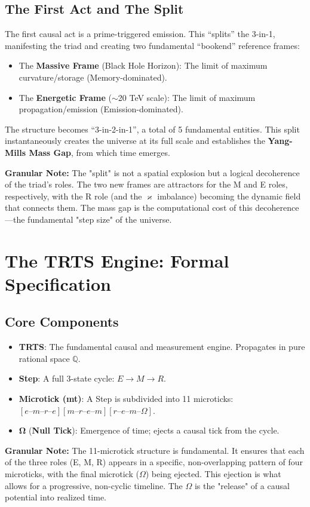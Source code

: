 \documentclass[12pt]{article}
\begin{document}
\subsection{The First Act and The Split}
The first causal act is a prime-triggered emission. This ``splits'' the 3-in-1, manifesting the triad and creating two fundamental ``bookend'' reference frames:
\begin{itemize}
    \item The \textbf{Massive Frame} (Black Hole Horizon): The limit of maximum curvature/storage (Memory-dominated).
    \item The \textbf{Energetic Frame} ($\sim$20 TeV scale): The limit of maximum propagation/emission (Emission-dominated).
\end{itemize}
The structure becomes ``3-in-2-in-1'', a total of 5 fundamental entities. This split instantaneously creates the universe at its full scale and establishes the \textbf{Yang-Mills Mass Gap}, from which time emerges.

\textbf{Granular Note:} The "split" is not a spatial explosion but a logical decoherence of the triad's roles. The two new frames are attractors for the M and E roles, respectively, with the R role (and the $\varkappa$ imbalance) becoming the dynamic field that connects them. The mass gap is the computational cost of this decoherence—the fundamental "step size" of the universe.

\section{The TRTS Engine: Formal Specification}

\subsection{Core Components}
\begin{itemize}
    \item \textbf{TRTS}: The fundamental causal and measurement engine. Propagates in pure rational space $\mathbb{Q}$.
    \item \textbf{Step}: A full 3-state cycle: $E \rightarrow M \rightarrow R$.
    \item \textbf{Microtick (mt)}: A Step is subdivided into 11 microticks: $[e\text{–}m\text{–}r\text{–}e][m\text{–}r\text{–}e\text{–}m][r\text{–}e\text{–}m\text{–}\Omega]$.
    \item $\mathbf{\Omega}$ (\textbf{Null Tick}): Emergence of time; ejects a causal tick from the cycle.
\end{itemize}
\textbf{Granular Note:} The 11-microtick structure is fundamental. It ensures that each of the three roles (E, M, R) appears in a specific, non-overlapping pattern of four microticks, with the final microtick ($\Omega$) being ejected. This ejection is what allows for a progressive, non-cyclic timeline. The $\Omega$ is the "release" of a causal potential into realized time.
\end{document}
